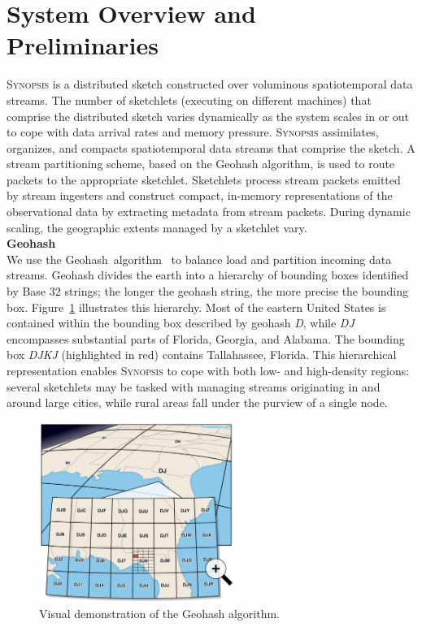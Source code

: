 \section{System Overview and Preliminaries}
\label{sec:system}
\textsc{Synopsis} is a distributed sketch constructed over voluminous spatiotemporal data streams.
The number of sketchlets (executing on different machines) that comprise the distributed sketch varies dynamically as the system scales in or out to cope with data arrival rates and memory pressure.
\textsc{Synopsis} assimilates, organizes, and compacts spatiotemporal data streams that comprise the sketch.
A stream partitioning scheme, based on the Geohash algorithm, is used to route packets to the appropriate sketchlet.
Sketchlets process stream packets emitted by stream ingesters and construct compact, in-memory representations of the observational data by extracting metadata from stream packets.
During dynamic scaling, the geographic extents managed by a sketchlet vary.
\vspace{1em} \\
\textbf{Geohash} \\
We use the Geohash~algorithm~\cite{geohash} to balance load and partition incoming data streams. Geohash divides the earth into a hierarchy of bounding boxes identified by Base 32 strings; the longer the geohash string, the more precise the bounding box. Figure~\ref{fig:geohash} illustrates this hierarchy. Most of the eastern United States is contained within the bounding box described by geohash \emph{D}, while \emph{DJ} encompasses substantial parts of Florida, Georgia, and Alabama. The bounding box \emph{DJKJ} (highlighted in red) contains Tallahassee, Florida. This hierarchical representation enables \textsc{Synopsis} to cope with both low- and high-density regions: several sketchlets may be tasked with managing streams originating in and around large cities, while rural areas fall under the purview of a single node.

\begin{figure}[b!]
    \centerline{\includegraphics[width=2.5in]{figures/geohash.pdf}}
    \caption{Visual demonstration of the Geohash algorithm.}
    \label{fig:geohash}
\end{figure}

